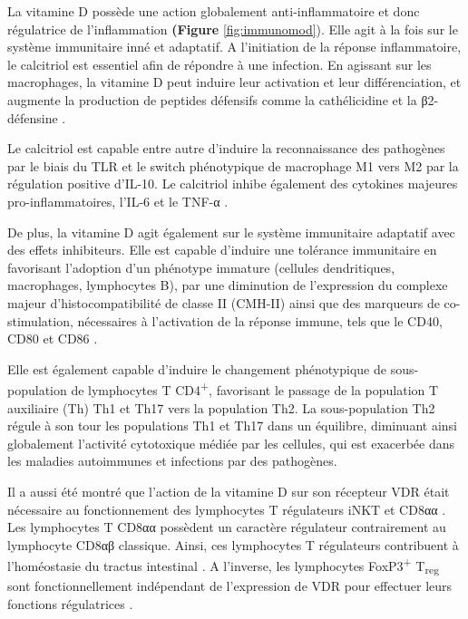 \documentclass[
  a4paper,
  DIV=11,
  numbers=noendperiod,
  listof=totoc]{scrreprt}
\begin{document}
La vitamine D possède une action globalement anti-inflammatoire et donc
régulatrice de l'inflammation \textbf{(Figure} \ref{fig:immunomod}).
Elle agit à la fois sur le système immunitaire inné et adaptatif. A
l'initiation de la réponse inflammatoire, le calcitriol est essentiel
afin de répondre à une infection. En agissant sur les macrophages, la
vitamine D peut induire leur activation et leur différenciation, et
augmente la production de peptides défensifs comme la cathélicidine et
la β2-défensine \autocite{Caprio.2017}.

Le calcitriol est capable entre autre d'induire la reconnaissance des
pathogènes par le biais du TLR et le switch phénotypique de macrophage
M1 vers M2 par la régulation positive d'IL-10. Le calcitriol inhibe
également des cytokines majeures pro-inflammatoires, l'IL-6 et le TNF-α
\autocite{Meza-Meza.2020,Caprio.2017}.

De plus, la vitamine D agit également sur le système immunitaire
adaptatif avec des effets inhibiteurs. Elle est capable d'induire une
tolérance immunitaire en favorisant l'adoption d'un phénotype immature
(cellules dendritiques, macrophages, lymphocytes B), par une diminution
de l'expression du complexe majeur d'histocompatibilité de classe II
(CMH-II) ainsi que des marqueurs de co-stimulation, nécessaires à
l'activation de la réponse immune, tels que le CD40, CD80 et CD86
\autocite{Meza-Meza.2020,Caprio.2017}.

Elle est également capable d'induire le changement phénotypique de
sous-population de lymphocytes T CD4\textsuperscript{+}, favorisant le
passage de la population T auxiliaire (Th) Th1 et Th17 vers la
population Th2. La sous-population Th2 régule à son tour les populations
Th1 et Th17 dans un équilibre, diminuant ainsi globalement l'activité
cytotoxique médiée par les cellules, qui est exacerbée dans les maladies
autoimmunes et infections par des
pathogènes\autocite{Holick.2011,Meza-Meza.2020}.

Il a aussi été montré que l'action de la vitamine D sur son récepteur
VDR était nécessaire au fonctionnement des lymphocytes T régulateurs
iNKT et CD8αα \autocite{Cheroutre.2008}. Les lymphocytes T CD8αα
possèdent un caractère régulateur contrairement au lymphocyte CD8αβ
classique. Ainsi, ces lymphocytes T régulateurs contribuent à
l'homéostasie du tractus intestinal \autocite{Cantorna.2010}. A
l'inverse, les lymphocytes FoxP3\textsuperscript{+} T\textsubscript{reg}
sont fonctionnellement indépendant de l'expression de VDR pour effectuer
leurs fonctions régulatrices \autocite{Cantorna.2010}.
\end{document}
